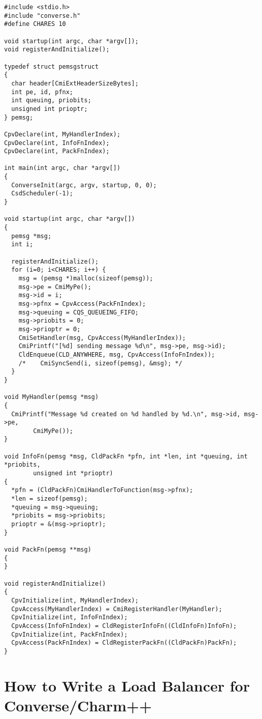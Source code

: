 \begin{verbatim}
#include <stdio.h>
#include "converse.h"
#define CHARES 10

void startup(int argc, char *argv[]);
void registerAndInitialize();

typedef struct pemsgstruct
{
  char header[CmiExtHeaderSizeBytes];
  int pe, id, pfnx;
  int queuing, priobits;
  unsigned int prioptr;
} pemsg;

CpvDeclare(int, MyHandlerIndex);
CpvDeclare(int, InfoFnIndex);
CpvDeclare(int, PackFnIndex);

int main(int argc, char *argv[]) 
{
  ConverseInit(argc, argv, startup, 0, 0);
  CsdScheduler(-1);
}

void startup(int argc, char *argv[])
{
  pemsg *msg;
  int i;
  
  registerAndInitialize();
  for (i=0; i<CHARES; i++) {
    msg = (pemsg *)malloc(sizeof(pemsg));
    msg->pe = CmiMyPe();
    msg->id = i;
    msg->pfnx = CpvAccess(PackFnIndex);
    msg->queuing = CQS_QUEUEING_FIFO;
    msg->priobits = 0;
    msg->prioptr = 0;
    CmiSetHandler(msg, CpvAccess(MyHandlerIndex));
    CmiPrintf("[%d] sending message %d\n", msg->pe, msg->id);
    CldEnqueue(CLD_ANYWHERE, msg, CpvAccess(InfoFnIndex));
    /*    CmiSyncSend(i, sizeof(pemsg), &msg); */
  }
}

void MyHandler(pemsg *msg)
{
  CmiPrintf("Message %d created on %d handled by %d.\n", msg->id, msg->pe, 
	    CmiMyPe());
}

void InfoFn(pemsg *msg, CldPackFn *pfn, int *len, int *queuing, int *priobits, 
	    unsigned int *prioptr)
{
  *pfn = (CldPackFn)CmiHandlerToFunction(msg->pfnx);
  *len = sizeof(pemsg);
  *queuing = msg->queuing;
  *priobits = msg->priobits;
  prioptr = &(msg->prioptr);
}

void PackFn(pemsg **msg)
{
}

void registerAndInitialize()
{
  CpvInitialize(int, MyHandlerIndex);
  CpvAccess(MyHandlerIndex) = CmiRegisterHandler(MyHandler);
  CpvInitialize(int, InfoFnIndex);
  CpvAccess(InfoFnIndex) = CldRegisterInfoFn((CldInfoFn)InfoFn);
  CpvInitialize(int, PackFnIndex);
  CpvAccess(PackFnIndex) = CldRegisterPackFn((CldPackFn)PackFn);
}
\end{verbatim}

\section{How to Write a Load Balancer for Converse/Charm++}


